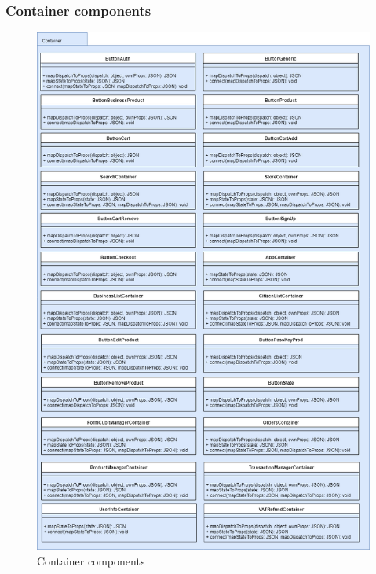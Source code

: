 \subsubsection{Container components}
\begin{figure}[h]
	\centering\includegraphics[scale = 0.4]{res/images/Container.png}
	\caption{Container components}
\end{figure}
